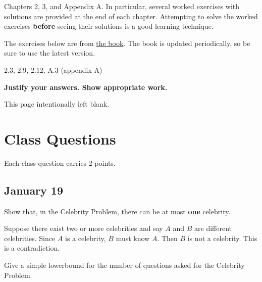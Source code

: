\documentclass[final]{article}
\begin{document}
\begin{titlepage}
    \begin{tcolorbox}[title=Reading,fonttitle=\bfseries]
        Chapters 2, 3, and Appendix A. In particular, several worked exercises with solutions are provided at the end of each chapter. Attempting to solve the worked exercises \textbf{before} seeing their solutions is a good learning technique.
    \end{tcolorbox}
    The exercises below are from \href{https://sites.google.com/site/gopalpandurangan/home/algorithms-course}{the book}. The book is updated periodically, so be sure to use the latest version.

    \begin{tcolorbox}[title=Exercises,fonttitle=\bfseries]
        2.3, 2.9, 2.12, A.3 (appendix A)
    \end{tcolorbox}

    \textbf{Justify your answers. Show appropriate work.}
\end{titlepage}
\vspace*{\fill}\begin{center}{\Huge This page intentionally left blank.}\end{center}\vspace*{\fill}\thispagestyle{empty}\clearpage
{}

\section{Class Questions}
Each class question carries 2 points.
\subsection{January 19}

\begin{question}
    Show that, in the Celebrity Problem, there can be at most \textbf{one} celebrity.
\end{question}

\begin{solution}
    Suppose there exist two or more celebrities and say $A$ and $B$ are different celebrities. Since $A$ is a celebrity, $B$ must know $A$. Then $B$ is not a celebrity. This is a contradiction.
\end{solution}

\begin{question}
    Give a simple lowerbound for the number of questions asked for the Celebrity Problem.
\end{question}
\end{document}
